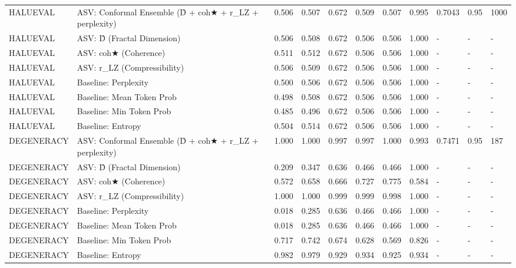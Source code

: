 \begin{table}[htbp]
\begin{tabular}{lllllllllll}
HALUEVAL & ASV: Conformal Ensemble (D̂ + coh★ + r_LZ + perplexity) & 0.506 & 0.507 & 0.672 & 0.509 & 0.507 & 0.995 & 0.7043 & 0.95 & 1000 \\
HALUEVAL & ASV: D̂ (Fractal Dimension) & 0.506 & 0.508 & 0.672 & 0.506 & 0.506 & 1.000 & - & - & - \\
HALUEVAL & ASV: coh★ (Coherence) & 0.511 & 0.512 & 0.672 & 0.506 & 0.506 & 1.000 & - & - & - \\
HALUEVAL & ASV: r_LZ (Compressibility) & 0.506 & 0.509 & 0.672 & 0.506 & 0.506 & 1.000 & - & - & - \\
HALUEVAL & Baseline: Perplexity & 0.500 & 0.506 & 0.672 & 0.506 & 0.506 & 1.000 & - & - & - \\
HALUEVAL & Baseline: Mean Token Prob & 0.498 & 0.508 & 0.672 & 0.506 & 0.506 & 1.000 & - & - & - \\
HALUEVAL & Baseline: Min Token Prob & 0.485 & 0.496 & 0.672 & 0.506 & 0.506 & 1.000 & - & - & - \\
HALUEVAL & Baseline: Entropy & 0.504 & 0.514 & 0.672 & 0.506 & 0.506 & 1.000 & - & - & - \\
DEGENERACY & ASV: Conformal Ensemble (D̂ + coh★ + r_LZ + perplexity) & 1.000 & 1.000 & 0.997 & 0.997 & 1.000 & 0.993 & 0.7471 & 0.95 & 187 \\
DEGENERACY & ASV: D̂ (Fractal Dimension) & 0.209 & 0.347 & 0.636 & 0.466 & 0.466 & 1.000 & - & - & - \\
DEGENERACY & ASV: coh★ (Coherence) & 0.572 & 0.658 & 0.666 & 0.727 & 0.775 & 0.584 & - & - & - \\
DEGENERACY & ASV: r_LZ (Compressibility) & 1.000 & 1.000 & 0.999 & 0.999 & 0.998 & 1.000 & - & - & - \\
DEGENERACY & Baseline: Perplexity & 0.018 & 0.285 & 0.636 & 0.466 & 0.466 & 1.000 & - & - & - \\
DEGENERACY & Baseline: Mean Token Prob & 0.018 & 0.285 & 0.636 & 0.466 & 0.466 & 1.000 & - & - & - \\
DEGENERACY & Baseline: Min Token Prob & 0.717 & 0.742 & 0.674 & 0.628 & 0.569 & 0.826 & - & - & - \\
DEGENERACY & Baseline: Entropy & 0.982 & 0.979 & 0.929 & 0.934 & 0.925 & 0.934 & - & - & - \\
\bottomrule
\end{tabular}
\end{table}
